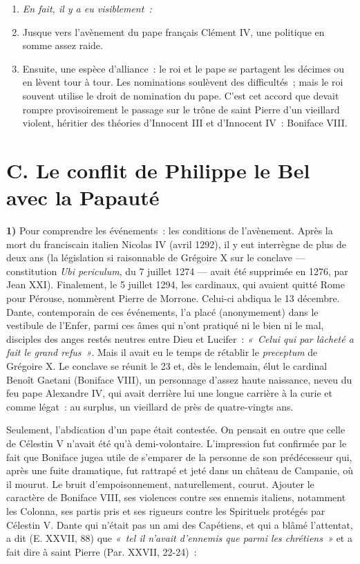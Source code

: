\documentclass[french,twoside]{book} %
\newlength{\listmod}
\newcommand{\listhead}[1]{\hspace{-1\listmod}\emph{#1}}
\newcommand{\labelchar}[1]{\textbf{\color{rubric} #1}}
\begin{document}
\begin{enumerate}[itemsep=0pt,]
\item[]\listhead{En fait, il y a eu visiblement :}
\item Jusque vers l’avènement du pape français Clément IV, une politique en somme assez raide.
\item Ensuite, une espèce d’alliance : le roi et le pape se partagent les décimes ou en lèvent tour à tour. Les nominations soulèvent des difficultés ; mais le roi souvent utilise le droit de nomination du pape. C’est cet accord que devait rompre provisoirement le passage sur le trône de saint Pierre d’un vieillard violent, héritier des théories d’Innocent III et d’Innocent IV : Boniface VIII.
\end{enumerate}

\section[{C. Le conflit de Philippe le Bel avec la Papauté }]{C. Le conflit de Philippe le Bel avec la Papauté \protect\footnotemark }
\label{c06c}
\noindent \labelchar{1)} Pour comprendre les événements : les conditions de l’avènement. Après la mort du franciscain italien Nicolas IV (avril 1292), il y eut interrègne de plus de deux ans (la législation si raisonnable de Grégoire X sur le conclave — constitution {\itshape Ubi periculum}, du 7 juillet 1274 — avait été supprimée en 1276, par Jean XXI).  
\label{p51} Finalement, le 5 juillet 1294, les cardinaux, qui avaient quitté Rome pour Pérouse, nommèrent Pierre de Morrone. Celui-ci abdiqua le 13 décembre. Dante, contemporain de ces événements, l’a placé (anonymement) dans le vestibule de l’Enfer, parmi ces âmes qui n’ont pratiqué ni le bien ni le mal, disciples des anges restés neutres entre Dieu et Lucifer : \emph{« Celui qui par lâcheté a fait le grand refus »}. Mais il avait eu le temps de rétablir le {\itshape preceptum} de Grégoire X. Le conclave se réunit le 23 et, dès le lendemain, élut le cardinal Benoît Gaetani (Boniface VIII), un personnage d’assez haute naissance, neveu du feu pape Alexandre IV, qui avait derrière lui une longue carrière à la curie et comme légat : au surplus, un vieillard de près de quatre-vingts ans.\par
Seulement, l’abdication d’un pape était contestée. On pensait en outre que celle de Célestin V n’avait été qu’à demi-volontaire. L’impression fut confirmée par le fait que Boniface jugea utile de s’emparer de la personne de son prédécesseur qui, après une fuite dramatique, fut rattrapé et jeté dans un château de Campanie, où il mourut. Le bruit d’empoisonnement, naturellement, courut. Ajouter le caractère de Boniface VIII, ses violences contre ses ennemis italiens, notamment les Colonna, ses partis pris et ses rigueurs contre les Spirituels protégés par Célestin V. Dante qui n’était pas un ami des Capétiens, et qui a blâmé l’attentat, a dit (E. XXVII, 88) que \emph{« tel il n’avait d’ennemis que parmi les chrétiens »} et a fait dire à saint Pierre (Par. XXVII, 22-24) :\par
\end{document}
